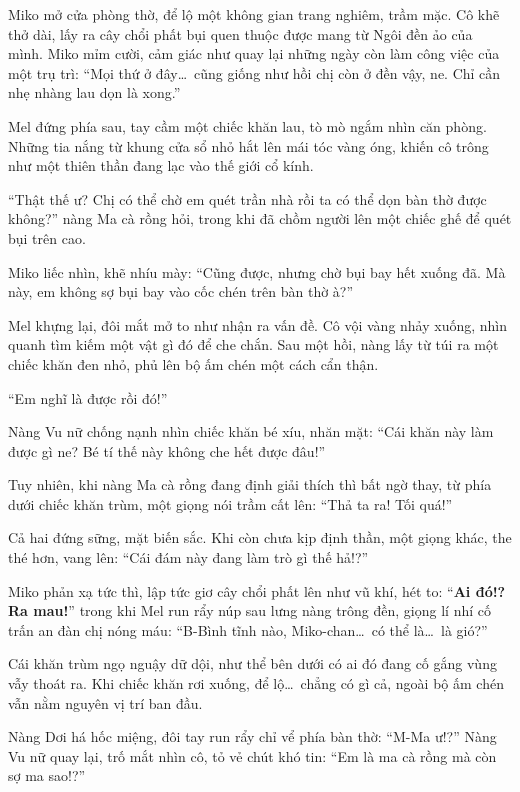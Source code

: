 \documentclass[../main.tex]{subfiles}
\begin{document}
Miko mở cửa phòng thờ, để lộ một không gian trang nghiêm, trầm mặc. Cô khẽ thở dài, lấy ra cây chổi phất bụi quen thuộc được mang từ Ngôi đền ảo của mình. Miko mỉm cười, cảm giác như quay lại những ngày còn làm công việc của một trụ trì: ``Mọi thứ ở đây\dots\ cũng giống như hồi chị còn ở đền vậy, ne. Chỉ cần nhẹ nhàng lau dọn là xong.''

Mel đứng phía sau, tay cầm một chiếc khăn lau, tò mò ngắm nhìn căn phòng. Những tia nắng từ khung cửa sổ nhỏ hắt lên mái tóc vàng óng, khiến cô trông như một thiên thần đang lạc vào thế giới cổ kính.

``Thật thế ư? Chị có thể chờ em quét trần nhà rồi ta có thể dọn bàn thờ được không?'' nàng Ma cà rồng hỏi, trong khi đã chồm người lên một chiếc ghế để quét bụi trên cao.

Miko liếc nhìn, khẽ nhíu mày: ``Cũng được, nhưng chờ bụi bay hết xuống đã. Mà này, em không sợ bụi bay vào cốc chén trên bàn thờ à?''

Mel khựng lại, đôi mắt mở to như nhận ra vấn đề. Cô vội vàng nhảy xuống, nhìn quanh tìm kiếm một vật gì đó để che chắn. Sau một hồi, nàng lấy từ túi ra một chiếc khăn đen nhỏ, phủ lên bộ ấm chén một cách cẩn thận.

``Em nghĩ là được rồi đó!''

Nàng Vu nữ chống nạnh nhìn chiếc khăn bé xíu, nhăn mặt: ``Cái khăn này làm được gì ne? Bé tí thế này không che hết được đâu!''

Tuy nhiên, khi nàng Ma cà rồng đang định giải thích thì bất ngờ thay, từ phía dưới chiếc khăn trùm, một giọng nói trầm cất lên: ``Thả ta ra! Tối quá!''

Cả hai đứng sững, mặt biến sắc. Khi còn chưa kịp định thần, một giọng khác, the thé hơn, vang lên: ``Cái đám này đang làm trò gì thế hả!?''

Miko phản xạ tức thì, lập tức giơ cây chổi phất lên như vũ khí, hét to: ``\textbf{Ai đó!? Ra mau!}'' trong khi Mel run rẩy núp sau lưng nàng trông đền, giọng lí nhí cố trấn an đàn chị nóng máu: ``B-Bình tĩnh nào, Miko-chan\dots\ có thể là\dots\ là gió?''

Cái khăn trùm ngọ nguậy dữ dội, như thể bên dưới có ai đó đang cố gắng vùng vẫy thoát ra. Khi chiếc khăn rơi xuống, để lộ\dots\ chẳng có gì cả, ngoài bộ ấm chén vẫn nằm nguyên vị trí ban đầu.

Nàng Dơi há hốc miệng, đôi tay run rẩy chỉ vể phía bàn thờ: ``M-Ma ư!?'' Nàng Vu nữ quay lại, trố mắt nhìn cô, tỏ vẻ chút khó tin: ``Em là ma cà rồng mà còn sợ ma sao!?''
\end{document}
